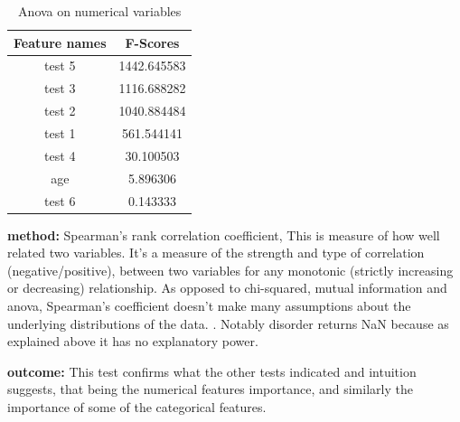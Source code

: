 \documentclass[a4paper]{article}
\begin{document}
\begin{table}[h]
    \centering
    \begin{tabular}{|c|c|}
    \hline
        Feature names & F-Scores \\
    \hline
        test 5 & 1442.645583 \\
    \hline
        test 3 & 1116.688282 \\
    \hline
        test 2 & 1040.884484 \\
    \hline
        test 1 & 561.544141  \\
    \hline
        test 4 & 30.100503   \\
    \hline
        age    & 5.896306    \\
    \hline
        test 6 & 0.143333    \\
    \hline

    \end{tabular}
    \caption{Anova on numerical variables}
    \label{tab:anova}
\end{table}

\textbf{method:} Spearman's rank correlation coefficient, This is measure of how well related two variables. It's a measure of the strength and type of correlation (negative/positive), between two variables for any monotonic (strictly increasing or decreasing) relationship. As opposed to chi-squared, mutual information and anova, Spearman's coefficient doesn't make many assumptions about the underlying distributions of the data. \cite{Bevans2023}. Notably disorder returns NaN because as explained above it has no explanatory power.

\textbf{outcome:} This test confirms what the other tests indicated and intuition suggests, that being the numerical features importance, and similarly the importance of some of the categorical features.
\end{document}
